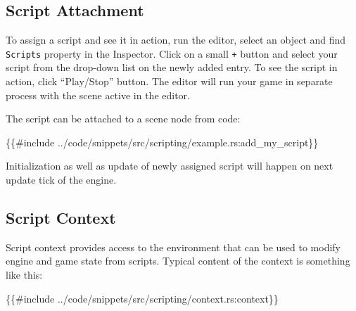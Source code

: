 \documentclass[
]{book}
\newenvironment{Shaded}{\begin{snugshade}}{\end{snugshade}}
\newcommand{\NormalTok}[1]{#1}
\theoremstyle{definition}
\theoremstyle{definition}
\theoremstyle{definition}
\theoremstyle{definition}
\theoremstyle{remark}
\begin{document}
\subsection{Script Attachment}\label{script-attachment}

To assign a script and see it in action, run the editor, select an object and find \texttt{Scripts} property in the Inspector. Click on a small \texttt{+} button and select your script from the drop-down list on the newly added entry. To see the script in action, click ``Play/Stop'' button. The editor will run your game in separate process with the scene active in the editor.

The script can be attached to a scene node from code:

\begin{Shaded}
\begin{Highlighting}[]
\NormalTok{\{\{\#include ../code/snippets/src/scripting/example.rs:add\_my\_script\}\}}
\end{Highlighting}
\end{Shaded}

Initialization as well as update of newly assigned script will happen on next update tick of the engine.

\subsection{Script Context}\label{script-context}

Script context provides access to the environment that can be used to modify engine and game state from scripts. Typical content of the context is something like this:

\begin{Shaded}
\begin{Highlighting}[]
\NormalTok{\{\{\#include ../code/snippets/src/scripting/context.rs:context\}\}}
\end{Highlighting}
\end{Shaded}
\end{document}
